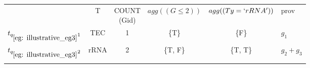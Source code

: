 \begin{example}
\begin{table}[htp]
\begin{tabular}[t]{c|c|c||c|c|b|}
&T&\makecell{COUNT\\(Gid)}&\makecell{$agg\\((G\leq2))$}&\makecell{$agg\\((Ty=`rRNA'))$}&prov\\ \hhline{~-----}
$t_{q_{\ref{eg: illustrative_eg3}}1}$&TEC&1&\{T\}&\{F\}&$g_1$\\ \hhline{~-----}
$t_{q_{\ref{eg: illustrative_eg3}}2}$&rRNA&2&\{T, F\}&\{T, T\}&$g_2 + g_3$\\ \hhline{~-----}
\end{tabular}

\end{table}
\end{example}


